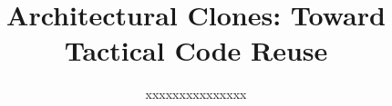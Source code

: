 \documentclass{sig-alternate}
\newif\ifisnopii
\begin{document}
\title{Architectural Clones: Toward Tactical Code Reuse}



\ifisnopii %
\author{
%
\alignauthor
Daniel E. Krutz and Mehdi Mirakhorl\\ 	
	\affaddr{Software Engineering Department}\\
       \affaddr{Rochester Institute of Technology}\\
       \affaddr{1 Lomb Memorial Drive}\\
       \affaddr{Rochester, NY, USA} \\
       \email{\{dkrutz, mehdi\}@se.rit.edu}
       \alignauthor
} %

\else %
\author{
%
\alignauthor
xxxxxxxxxxxxxxx\\ 	
	\\
       \\
       \\
        \\
       \alignauthor
} %
\fi %


\maketitle
\end{document}
